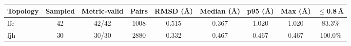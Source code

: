 \begin{tabular}{lcccccccc}
\toprule
Topology & Sampled & Metric-valid & Pairs & RMSD (\AA) & Median (\AA) & p95 (\AA) & Max (\AA) & $\le$0.8\,\AA \\
\midrule
ffc & 42 & 42/42 & 1008 & 0.515 & 0.367 & 1.020 & 1.020 & 83.3\% \\
fjh & 30 & 30/30 & 2880 & 0.332 & 0.467 & 0.467 & 0.467 & 100.0\% \\
\bottomrule
\end{tabular}
